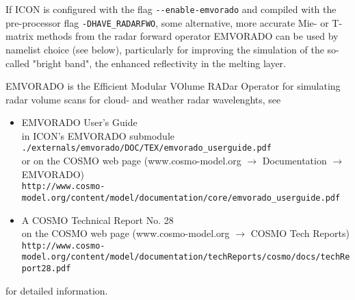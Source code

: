   If ICON is configured with the flag \verb+--enable-emvorado+ and compiled with
  the pre-processor flag \verb+-DHAVE_RADARFWO+, some alternative, more accurate
  Mie- or T-matrix methods from the radar forward operator EMVORADO can be used by namelist choice (see below), particularly for
  improving the simulation of the so-called "bright band", the enhanced reflectivity in the melting layer.
  
%
EMVORADO is the Efficient Modular VOlume RADar Operator for simulating radar volume scans for cloud- and weather radar wavelenghts, see
\begin{itemize}
\item EMVORADO User's Guide\\
  in ICON's EMVORADO submodule \verb+./externals/emvorado/DOC/TEX/emvorado_userguide.pdf+\\
  or on the COSMO web page (\mbox{www.cosmo-model.org} $\rightarrow$ Documentation $\rightarrow$ EMVORADO)\\
  \verb+http://www.cosmo-model.org/content/model/documentation/core/emvorado_userguide.pdf+
\item A COSMO Technical Report No. 28\\
  on the COSMO web page (\mbox{www.cosmo-model.org} $\rightarrow$ COSMO Tech Reports)\\
  \verb+http://www.cosmo-model.org/content/model/documentation/techReports/cosmo/docs/techReport28.pdf+
\end{itemize}
for detailed information.


